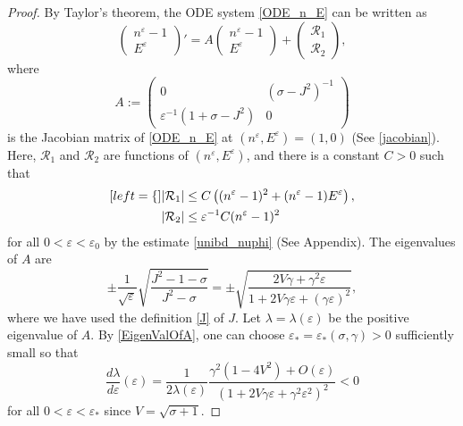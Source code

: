 \documentclass{amsart}
\newcommand{\veps}{\varepsilon}
\numberwithin{equation}{section}
\theoremstyle{plain}%
\theoremstyle{definition}
\theoremstyle{remark}
\theoremstyle{remark}
\begin{document}
\begin{proof}
By Taylor's theorem, the ODE system \eqref{ODE_n_E} can be written as
\begin{equation}\label{ExpandODE}
\begin{pmatrix}
n^\veps-1\\
E^\veps
\end{pmatrix}'
= A\begin{pmatrix}
n^\veps-1 \\
E^\veps
\end{pmatrix} 
+
\begin{pmatrix}
\mathcal{R}_1 \\
\mathcal{R}_2
\end{pmatrix},
\end{equation}
where
\begin{equation}
A:=\begin{pmatrix}
0 & (\sigma-J^2)^{-1} \\
\veps^{-1}(1 +\sigma - J^2) & 0
\end{pmatrix}
\end{equation}
is the Jacobian matrix of \eqref{ODE_n_E} at $(n^\veps,E^\veps)=(1,0)$ (See \eqref{jacobian}). Here, $\mathcal{R}_1$ and $\mathcal{R}_2$ are functions of $(n^\veps,E^\veps)$, and there is a constant $C>0$ such that 
\begin{subequations}\label{R1R2estimat}
\begin{align}[left = \empheqlbrace\,]
& |\mathcal{R}_1| \leq C \left( (n^\veps-1)^2 + (n^\veps-1)E^\veps \right),  \label{R1R2estimate1} \\
& |\mathcal{R}_2| \leq \veps^{-1}C(n^\veps-1)^2\label{R1R2estimate2}
\end{align}
\end{subequations}
for all $0 < \veps < \veps_0$ by the estimate \eqref{unibd_nuphi} (See Appendix). The eigenvalues of $A$ are 
\begin{equation}\label{EigenValOfA}
\pm\frac{1}{\sqrt{\veps}}\sqrt{\frac{J^2-1-\sigma}{J^2-\sigma}} 
= \pm \sqrt{\frac{ 2V\gamma + \gamma^2\veps}{1+2V\gamma\veps + (\gamma\veps)^2 }},
\end{equation}
where we have used the definition \eqref{J} of $J$. Let $\lambda=\lambda(\veps)$ be the positive eigenvalue of $A$. By \eqref{EigenValOfA}, one can choose  $\veps_\ast=\veps_\ast(\sigma,\gamma)>0$ sufficiently small so that 
\[
\frac{d\lambda}{d\veps}(\veps)= \frac{1}{2\lambda(\veps)} \frac{\gamma^2(1-4V^2)+O(\veps)}{(1+2V\gamma\veps+\gamma^2\veps^2)^2} < 0
\]
for all $0<\veps<\veps_\ast$ since $V=\sqrt{\sigma +1}$. %

\end{proof}
\end{document}
